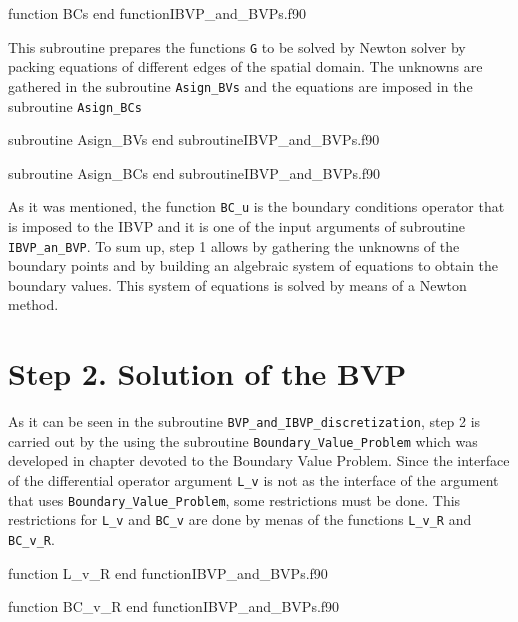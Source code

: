 \vspace{0.5cm} 
{function BCs}
{end function}{IBVP_and_BVPs.f90}

This subroutine prepares the functions \verb|G| to be solved by Newton solver by packing equations of different edges of the spatial domain. The unknowns are gathered in the subroutine \verb|Asign_BVs| and the equations are imposed in the subroutine \verb|Asign_BCs|

\vspace{0.5cm} 
{subroutine Asign_BVs}
{end subroutine}{IBVP_and_BVPs.f90}

\vspace{0.5cm} 
{subroutine Asign_BCs}
{end subroutine}{IBVP_and_BVPs.f90}
  

As it was mentioned, the function \verb|BC_u| is the boundary conditions operator that is imposed to the IBVP and it is one of the  input arguments of
subroutine \verb|IBVP_an_BVP|. To sum up, step 1 allows by gathering the unknowns of the boundary points and by building an algebraic  system of equations to obtain the boundary values. This system of equations is solved by means of a Newton method.  


\newpage 
\section{Step 2. Solution of the BVP}
As it can be seen in the subroutine  \verb|BVP_and_IBVP_discretization|, step 2 is carried out by the using the  subroutine  
 \verb|Boundary_Value_Problem| which was developed in chapter devoted to the Boundary Value Problem.  
Since the interface of the differential operator argument  \verb|L_v| is not as the interface of the  argument that uses
\verb|Boundary_Value_Problem|, some restrictions must be done. 
This restrictions for \verb|L_v| and \verb|BC_v| are done by menas of the functions \verb|L_v_R| and \verb|BC_v_R|.

\vspace{0.5cm} 
{function L_v_R}
{end function}{IBVP_and_BVPs.f90}

\vspace{0.5cm} 
{function BC_v_R}
{end function}{IBVP_and_BVPs.f90}

